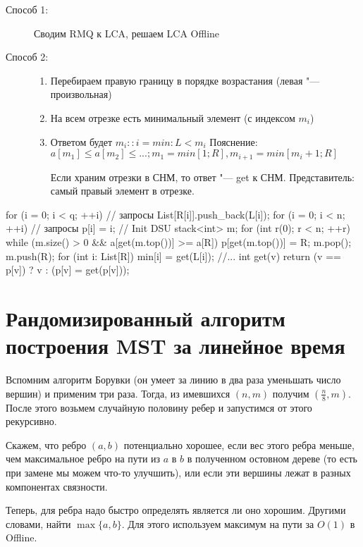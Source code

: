 \begin{description}
\item[Способ 1:]
	Сводим RMQ к LCA, решаем LCA Offline

\item[Способ 2:]
	\begin{enumerate}
	\item
		Перебираем правую границу в порядке возрастания (левая "--- произвольная)

	\item
		На всем отрезке есть минимальный элемент (с индексом $m_i$)

	\item
		Ответом будет $m_i\colon: i = min: L < m_i$
		Пояснение:   $a[m_1] \le a[m_2] \le ...; m_1 = 	{min}[1; R],     

m_{i+1} = 	{min}[m_i + 1; R]$

		Если храним отрезки в СНМ, то ответ "--- get к СНМ. Представитель: самый правый элемент в отрезке.
	\end{enumerate}
\end{description}

\begin{cppcode}
for (i = 0; i < q; ++i) // запросы
	List[R[i]].push_back(L[i]);
for (i = 0; i < n; ++i) // запросы
	p[i] = i; // Init DSU
stack<int> m;
for (int r(0); r < n; ++r)
	while (m.size() > 0 && a[get(m.top())] >= a[R])
		p[get(m.top())] = R;
		m.pop();
	m.push(R);
	for (int i: List[R])
		min[i] = get(L[i]);
//...
int get(v) {
	return (v == p[v]) ? v : (p[v] = get(p[v]));
}
\end{cppcode}

\section{Рандомизированный алгоритм построения MST за линейное время}

Вспомним алгоритм Борувки (он умеет за линию в два раза уменьшать число вершин) и применим три раза.
Тогда, из имевшихся $(n, m)$ получим $\left(\frac{n}{8}, m\right)$.
После этого возьмем случайную половину ребер и запустимся от этого рекурсивно.

Скажем, что ребро $(a, b)$ потенциально хорошее, если вес этого ребра меньше,
чем максимальное ребро на пути из $a$ в $b$ в полученном остовном дереве (то есть при замене мы можем что-то улучшить),
или если эти вершины лежат в разных компонентах связности.

Теперь, для ребра надо быстро определять является ли оно хорошим.
Другими словами, найти $\max\{a, b\}$. Для этого используем максимум на пути за $O(1)$ в Offline.

